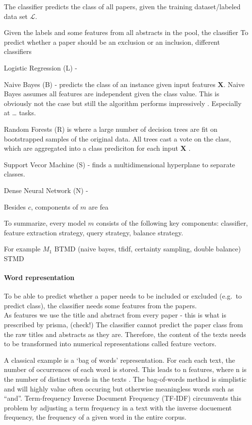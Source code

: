\documentclass[
]{article}
\begin{document}
The classifier predicts the class of all papers, given the training
dataset/labeled data set \(\mathcal{L}\).

Given the labels and some features from all abstracts in the pool, the
classifier To predict whether a paper should be an exclusion or an
inclusion, different classifiers

Logistic Regression (L) -

Naive Bayes (B) - predicts the class of an instance given input features
\(\mathbf{X}\). Naive Bayes assumes all features are independent given
the class value. This is obviously not the case but still the algorithm
performs impressively \autocite{Zhang2004}. Especially at \ldots{}
tasks.

Random Forests (R) is where a large number of decision trees are fit on
bootstrapped samples of the original data. All trees cast a vote on the
class, which are aggregated into a class prediciton for each input
\(\mathbf{X}\) \autocite{Breiman2001}.

Support Vecor Machine (S) - finds a multidimensional hyperplane to
separate classes. \autocite{Tong2001}

Dense Neural Network (N) -

Besides \(c\), components of \(m\) are fea

To summarize, every model \(m\) consists of the following key
components: classifier, feature extraction strategy, query strategy,
balance strategy.

For example \(M_1\) BTMD (naive bayes, tfidf, certainty sampling, double
balance) STMD

\hypertarget{word-representation}{%
\paragraph{Word representation}\label{word-representation}}

To be able to predict whether a paper needs to be included or excluded
(e.g.~to predict class), the classifier needs some features from the
papers.\\
As features we use the title and abstract from every paper - this is
what is prescribed by prisma, (check!) The classifier cannot predict the
paper class from the raw titles and abstracts as they are. Therefore,
the content of the texts needs to be transformed into numerical
representations called feature vectors.

A classical example is a `bag of words' representation. For each each
text, the number of occurrences of each word is stored. This leads to n
features, where n is the number of distinct words in the texts
\autocite{scikit-learn}. The bag-of-words method is simplistic and will
highly value often occuring but otherwise meaningless words such as
``and''. Term-frequency Inverse Document Frequency (TF-IDF)
\autocite{Ramos2003} circumvents this problem by adjusting a term
frequency in a text with the inverse docuement frequency, the frequency
of a given word in the entire corpus.
\end{document}
